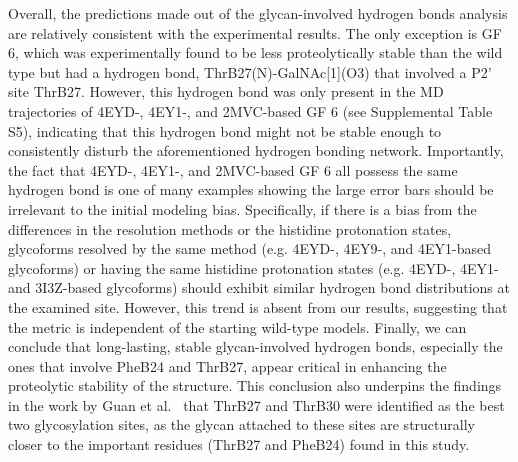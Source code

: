 \documentclass[9pt]{elife}
\begin{document}
Overall, the predictions made out of the glycan-involved hydrogen bonds analysis are relatively consistent with the experimental results. The only exception is GF 6, which was experimentally found to be less proteolytically stable than the wild type but had a hydrogen bond, ThrB27(N)-GalNAc[1](O3) that involved a P2' site ThrB27. However, this hydrogen bond was only present in the MD trajectories of 4EYD-, 4EY1-, and 2MVC-based GF 6 (see Supplemental Table S5), indicating that this hydrogen bond might not be stable enough to consistently disturb the aforementioned hydrogen bonding network. Importantly, the fact that 4EYD-, 4EY1-, and 2MVC-based GF 6 all possess the same hydrogen bond is one of many examples showing the large error bars should be irrelevant to the initial modeling bias. Specifically, if there is a bias from the differences in the resolution methods or the histidine protonation states, glycoforms resolved by the same method (e.g. 4EYD-, 4EY9-, and 4EY1-based glycoforms) or having the same histidine protonation states (e.g. 4EYD-, 4EY1- and 3I3Z-based glycoforms) should exhibit similar hydrogen bond distributions at the examined site. However, this trend is absent from our results, suggesting that the metric is independent of the starting wild-type models. Finally, we can conclude that long-lasting, stable glycan-involved hydrogen bonds, especially the ones that involve PheB24 and ThrB27, appear critical in enhancing the proteolytic stability of the structure. This conclusion also underpins the findings in the work by Guan et al.~\cite{guan2018chemically} that ThrB27 and ThrB30 were identified as the best two glycosylation sites, as the glycan attached to these sites are structurally closer to the important residues (ThrB27 and PheB24) found in this study. 
\end{document}
